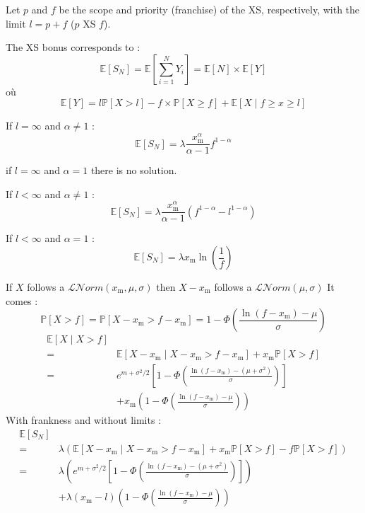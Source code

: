 \begin{f}
Let \(p\) and \(f\) be the scope and priority (franchise) of the XS, respectively, with the limit \(l=p+f\) (\(p\) XS \(f\)).

The XS bonus corresponds to :
\[
\mathbb{E}\left[S_N\right]=\mathbb{E}\left[\sum_{i=1}^{N} Y_{i}\right]=\mathbb{E}[N]\times \mathbb{E}[Y]
\]
où
\[
\mathbb{E}[Y]= l \mathbb{P}[X>l] - f \times \mathbb{P}[X\geq f] + \mathbb{E}[X\mid f\geq x\geq l]
\]


If \(l=\infty\) and \(\alpha \neq 1\) :
\[
\mathbb{E}[S_N] = \lambda \frac{x_\mathrm{m}^{\alpha}}{\alpha -1}f^{1-\alpha} 
\]

if  \(l=\infty\) and \(\alpha = 1\) there is no solution.

If \(l<\infty\) and \(\alpha \neq 1\) :
\[
\mathbb{E}[S_N] = \lambda \frac{x_\mathrm{m}^{\alpha}}{\alpha -1}\left( f^{1-\alpha} -l^{1-\alpha} \right)
\]

If \(l<\infty\) and \(\alpha = 1\) :
\[
\mathbb{E}[S_N] = \lambda x_\mathrm{m} \ln \left(  \frac{1}{f}\right)
\]
\end{f}



\begin{f}

If \(X\) follows a \(\mathcal{L}\mathcal{N}orm(x_\mathrm{m}, \mu, \sigma)\) then \(X-x_\mathrm{m}\) follows a \(\mathcal{L}\mathcal{N}orm(\mu, \sigma)\)
It comes :
\[
\mathbb{P}[X>f]=\mathbb{P}[X-x_\mathrm{m}>f-x_\mathrm{m}]=1-\Phi\left(\frac{\ln(f-x_\mathrm{m})-\mu}{\sigma}\right)
\]
\begin{align*}
	\mathbb{E}[X\mid X>f] \\ 
	= & \mathbb{E}\left[ X-x_\mathrm{m}\mid X-x_\mathrm{m}>f-x_\mathrm{m} \right]+x_\mathrm{m} \mathbb{P}[X>f]\\
	= & e ^{m+\sigma^2/2} \left[1-\Phi\left(\frac{\ln(f-x_\mathrm{m})-(\mu+\sigma^2)}{\sigma}\right) \right]\\
	& +x_\mathrm{m} \left( 1-\Phi\left(\frac{\ln(f-x_\mathrm{m})-\mu}{\sigma}\right) \right)
\end{align*}
With frankness and without limits :
\begin{align*}
	\mathbb{E}[S_N] \\ 
	= & \lambda \left(\mathbb{E}\left[ X-x_\mathrm{m}\mid X-x_\mathrm{m}>f-x_\mathrm{m} \right]+x_\mathrm{m} \mathbb{P}[X>f]-f\mathbb{P}[X>f]\right)\\
	= & \lambda \left(  e ^{m+\sigma^2/2} \left[1-\Phi\left(\frac{\ln(f-x_\mathrm{m})-(\mu+\sigma^2)}{\sigma}\right) \right]\right)\\
	& +\lambda (x_\mathrm{m}-l) \left( 1-\Phi\left(\frac{\ln(f-x_\mathrm{m})-\mu}{\sigma}\right) \right)
\end{align*}

\end{f}
